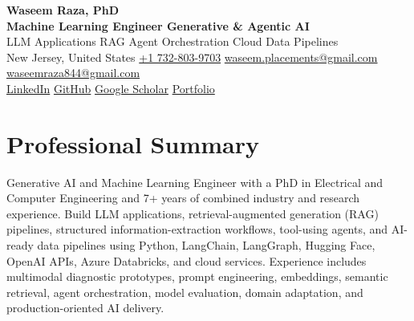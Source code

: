 \documentclass[9pt,letterpaper]{extarticle}
\begin{document}
\begin{center}
{\LARGE\bfseries Waseem Raza, PhD}\\[2pt]
{\large\bfseries Machine Learning Engineer \textbar{} Generative \& Agentic AI}\\[1pt]
{\small LLM Applications \textbar{} RAG \textbar{} Agent Orchestration \textbar{} Cloud Data Pipelines}\\[3pt]
{\footnotesize New Jersey, United States \quad {}\enspace \href{tel:+17328039703}{+1 732-803-9703} \quad {}\enspace \href{mailto:waseem.placements@gmail.com}{waseem.placements@gmail.com} \textbar{} \href{mailto:waseemraza844@gmail.com}{waseemraza844@gmail.com}\\[1pt]\href{https://www.linkedin.com/in/waseem-raza-phd-9a737858/}{LinkedIn} \textbar{} \href{https://github.com/WaseemRaza844}{GitHub} \textbar{} \href{https://scholar.google.com/citations?user=d58Drr0AAAAJ\&hl=en}{Google Scholar} \textbar{} \href{https://waseemraza844.github.io/portfolio/}{Portfolio}}
\end{center}
\vspace{-5pt}
\section{Professional Summary}
Generative AI and Machine Learning Engineer with a PhD in Electrical and Computer Engineering and 7+ years of combined industry and research experience. Build LLM applications, retrieval-augmented generation (RAG) pipelines, structured information-extraction workflows, tool-using agents, and AI-ready data pipelines using Python, LangChain, LangGraph, Hugging Face, OpenAI APIs, Azure Databricks, and cloud services. Experience includes multimodal diagnostic prototypes, prompt engineering, embeddings, semantic retrieval, agent orchestration, model evaluation, domain adaptation, and production-oriented AI delivery.
\end{document}
